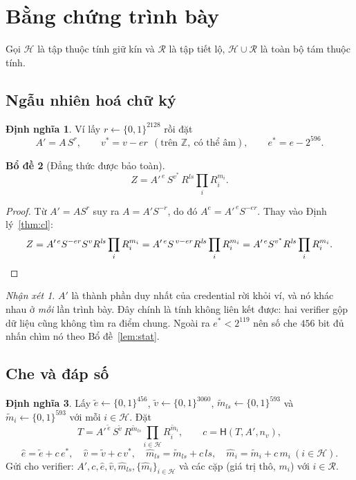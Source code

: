 \documentclass[a4paper,11pt]{article}
\theoremstyle{definition}
\newtheorem{definition}{Định nghĩa}[section]
\theoremstyle{plain}
\newtheorem{lemma}[definition]{Bổ đề}
\theoremstyle{remark}
\newtheorem*{remark}{Nhận xét}
\newcommand{\Hid}{\mathcal{H}}
\newcommand{\Rev}{\mathcal{R}}
\newcommand{\Hash}{\mathsf{H}}
\begin{document}
\section{Bằng chứng trình bày}

Gọi $\Hid$ là tập thuộc tính giữ kín và $\Rev$ là tập tiết lộ, $\Hid \cup \Rev$ là toàn
bộ tám thuộc tính.

\subsection{Ngẫu nhiên hoá chữ ký}

\begin{definition}
Ví lấy $r\leftarrow\{0,1\}^{2128}$ rồi đặt
\[
A' = A\,S^{r},\qquad
v^{*} = v - e r \ \ (\text{trên }\mathbb{Z},\ \text{có thể âm}),\qquad
e^{*} = e - 2^{596}.
\]
\end{definition}

\begin{lemma}[Đẳng thức được bảo toàn]
\label{lem:rerand}
\[
Z = A'^{\,e}\, S^{v^{*}}\, R^{\mathit{ls}} \prod_i R_i^{m_i}.
\]
\end{lemma}

\begin{proof}
Từ $A'=A S^{r}$ suy ra $A = A' S^{-r}$, do đó $A^{e} = A'^{\,e} S^{-er}$. Thay vào
Định lý~\ref{thm:cl}:
\[
Z = A'^{\,e} S^{-er} S^{v} R^{\mathit{ls}} \prod_i R_i^{m_i}
  = A'^{\,e} S^{\,v-er} R^{\mathit{ls}} \prod_i R_i^{m_i}
  = A'^{\,e} S^{v^{*}} R^{\mathit{ls}} \prod_i R_i^{m_i}. \qedhere
\]
\end{proof}

\begin{remark}
$A'$ là thành phần duy nhất của credential rời khỏi ví, và nó khác nhau ở \emph{mỗi} lần
trình bày. Đây chính là tính không liên kết được: hai verifier gộp dữ liệu cũng không tìm
ra điểm chung. Ngoài ra $e^{*}<2^{119}$ nên số che $456$ bit đủ nhấn chìm nó theo
Bổ đề~\ref{lem:stat}.
\end{remark}

\subsection{Che và đáp số}

\begin{definition}
Lấy $\tilde e\leftarrow\{0,1\}^{456}$, $\tilde v\leftarrow\{0,1\}^{3060}$,
$\tilde m_{\mathit{ls}}\leftarrow\{0,1\}^{593}$ và
$\tilde m_i\leftarrow\{0,1\}^{593}$ với mỗi $i\in\Hid$. Đặt
\[
T = A'^{\,\tilde e}\, S^{\tilde v}\, R^{\tilde m_{\mathit{ls}}}
    \prod_{i\in\Hid} R_i^{\tilde m_i},
\qquad
c = \Hash(T, A', n_v),
\]
\[
\hat e = \tilde e + c\,e^{*},\quad
\hat v = \tilde v + c\,v^{*},\quad
\hat m_{\mathit{ls}} = \tilde m_{\mathit{ls}} + c\,\mathit{ls},\quad
\hat m_i = \tilde m_i + c\,m_i \ (i\in\Hid).
\]
Gửi cho verifier: $A',c,\hat e,\hat v,\hat m_{\mathit{ls}},\{\hat m_i\}_{i\in\Hid}$ và
các cặp (giá trị thô, $m_i$) với $i\in\Rev$.
\end{definition}
\end{document}
